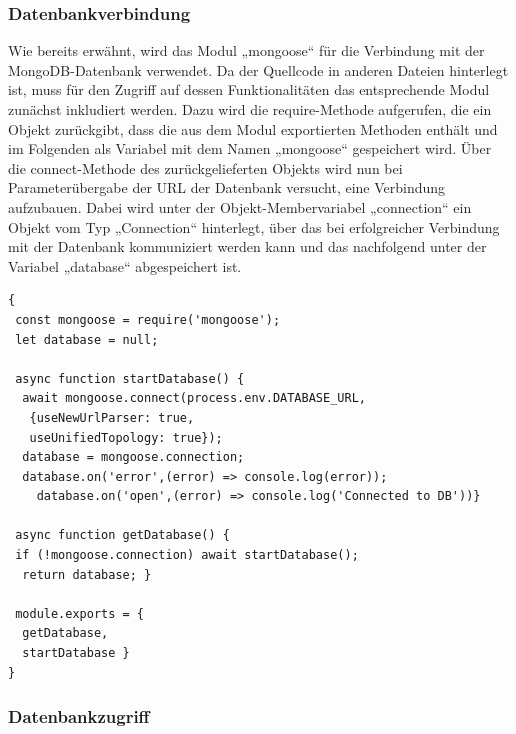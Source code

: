 \subsubsection{Datenbankverbindung}
Wie bereits erwähnt, wird das Modul „mongoose“ für die Verbindung mit der MongoDB-Datenbank verwendet. 
Da der Quellcode in anderen Dateien hinterlegt ist, muss für den Zugriff auf dessen Funktionalitäten das entsprechende Modul zunächst inkludiert werden. Dazu wird die require-Methode aufgerufen, die ein Objekt zurückgibt, dass die aus dem Modul exportierten Methoden enthält und im Folgenden als Variabel mit dem Namen „mongoose“ gespeichert wird. 
\newline
Über die connect-Methode des zurückgelieferten Objekts wird nun bei Parameterübergabe der URL der Datenbank versucht, eine Verbindung aufzubauen.  
Dabei wird unter der Objekt-Membervariabel  „connection“ ein Objekt vom Typ „Connection“ hinterlegt, über das bei erfolgreicher Verbindung mit der Datenbank kommuniziert werden kann und das nachfolgend unter der Variabel „database“ abgespeichert ist.\\

\begin{lstlisting}[caption=Verbindung zur MongoDB-Datenbank, label=lst:mongodbconnection]
{
 const mongoose = require('mongoose');
 let database = null;

 async function startDatabase() {
  await mongoose.connect(process.env.DATABASE_URL, 
   {useNewUrlParser: true,
   useUnifiedTopology: true}); 
  database = mongoose.connection;
  database.on('error',(error) => console.log(error));
  	database.on('open',(error) => console.log('Connected to DB'))}

 async function getDatabase() {
 if (!mongoose.connection) await startDatabase();
  return database; }

 module.exports = {
  getDatabase,
  startDatabase }
}
\end{lstlisting}



\subsubsection{Datenbankzugriff}                   


